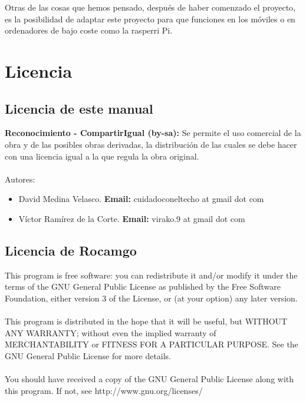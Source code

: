\documentclass[12pt,a4paper]{report}
\begin{document}
Otras de las cosas que hemos pensado, después de haber comenzado el proyecto, es
la posibilidad de adaptar este proyecto para que funciones en los móviles o en
ordenadores de bajo coste como la rasperri Pi. 


\chapter{Licencia}

\section{Licencia de este manual}

\textbf{Reconocimiento - CompartirIgual (by-sa):} Se permite el uso comercial de
la obra y de las posibles obras derivadas, la distribución de las cuales se debe
hacer con una licencia igual a la que regula la obra original. \\ \\


Autores: 
\begin{itemize} 
    \item David Medina Velasco. \textbf{Email:} cuidadoconeltecho at gmail dot com 
    \item Víctor Ramírez de la Corte. \textbf{Email:} virako.9 at gmail dot com 
\end{itemize}

\section{Licencia de Rocamgo}

This program is free software: you can redistribute it and/or modify it under
the terms of the GNU General Public License as published by the Free Software
Foundation, either version 3 of the License, or (at your option) any later
version. \\ \\ This program is distributed in the hope that it will be useful,
but WITHOUT ANY WARRANTY; without even the implied warranty of MERCHANTABILITY
or FITNESS FOR A PARTICULAR PURPOSE.  See the GNU General Public License for
more details. \\ \\ You should have received a copy of the GNU General Public
License along with this program.  If not, see http://www.gnu.org/licenses/
\end{document}
